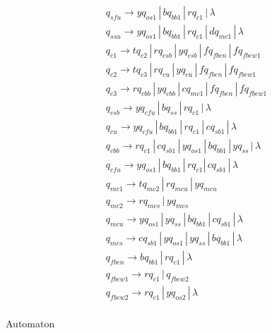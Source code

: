 \documentclass{article}
\begin{document}
\begin{mylist}
\begin{align*}
&q_{sfu} \rightarrow yq_{os1} \, | \, bq_{bb1} \, | \, rq_{c1} \, | \, \lambda\\ 
&q_{ssu} \rightarrow yq_{os1} \, | \, bq_{bb1} \, | \, rq_{c1} \, | \, dq_{mc1}\, | \, \lambda\\ 
&q_{c1} \rightarrow tq_{c2} \, | \,  rq_{csb} \, | \, yq_{csb} \, | \, fq_{fben} \, | \, fq_{fbew1}\\ 
&q_{c2} \rightarrow tq_{c3} \, | \,  rq_{cu} \, | \, yq_{cu} \, | \, fq_{fben} \, | \, fq_{fbew1}\\ 
&q_{c3} \rightarrow rq_{cbb} \, | \,  yq_{cbb} \, | \, cq_{mc1} \, | \, fq_{fben} \, | \, fq_{fbew1}\ \\ 
&q_{csb} \rightarrow yq_{cfu} \, | \,  bq_{ss} \, | \, rq_{c1} \, | \, \lambda \\ 
&q_{cu} \rightarrow yq_{cfu} \, | \,  bq_{bb1} \, | \, rq_{c1} \, | \, cq_{sb1} \, | \, \lambda \\ 
&q_{cbb} \rightarrow rq_{c1} \, | \,  cq_{sb1} \, | \, yq_{os1} \, | \, bq_{bb1} \, | \, yq_{ss} \, | \, \lambda \\ 
&q_{cfu} \rightarrow yq_{os1} \, | \,  bq_{bb1} \, | \, rq_{c1} | \, cq_{sb1} \, | \, \lambda\\ 
&q_{mc1} \rightarrow tq_{mc2} \, | \, rq_{mcu} \, | \, yq_{mcu}\\
&q_{mc2} \rightarrow rq_{mcs} \, | \, yq_{mcs}\\
&q_{mcu} \rightarrow yq_{os1} \, | \, yq_{ss} \, | \, bq_{bb1} \, | \, cq_{sb1} \, | \, \lambda\\
&q_{mcs} \rightarrow cq_{sb1} \, | \, yq_{os1} \, | \, yq_{ss} \, | \, bq_{bb1}\, | \, \lambda\\
&q_{fben} \rightarrow bq_{bb1} \, | \, rq_{c1} \, | \, \lambda\\
&q_{fbew1} \rightarrow rq_{c1} \, | \, q_{fbew2} \\
&q_{fbew2} \rightarrow rq_{c1} \, | \, yq_{os2} \, | \, \lambda\\
\end{align*}

\newpage
{}
\item Automaton

\begin{center}


\end{center}
\end{mylist}
\end{document}

